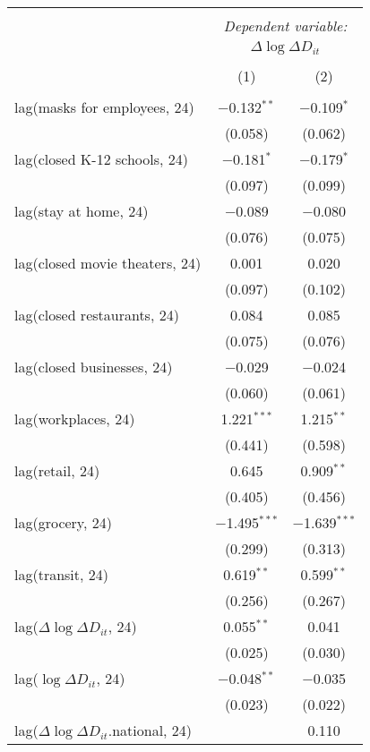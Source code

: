 \begin{tabular}{@{\extracolsep{1pt}}lcc} 
\\[-1.8ex]\hline 
\hline \\[-1.8ex] 
 & \multicolumn{2}{c}{\textit{Dependent variable:}} \\ 
\cline{2-3} 
 & \multicolumn{2}{c}{$\Delta \log \Delta D_{it}$} \\ 
\\[-1.8ex] & (1) & (2)\\ 
\hline \\[-1.8ex] 
 lag(masks for employees, 24) & $-$0.132$^{**}$ & $-$0.109$^{*}$ \\ 
  & (0.058) & (0.062) \\ 
  lag(closed K-12 schools, 24) & $-$0.181$^{*}$ & $-$0.179$^{*}$ \\ 
  & (0.097) & (0.099) \\ 
  lag(stay at home, 24) & $-$0.089 & $-$0.080 \\ 
  & (0.076) & (0.075) \\ 
  lag(closed movie theaters, 24) & 0.001 & 0.020 \\ 
  & (0.097) & (0.102) \\ 
  lag(closed restaurants, 24) & 0.084 & 0.085 \\ 
  & (0.075) & (0.076) \\ 
  lag(closed businesses, 24) & $-$0.029 & $-$0.024 \\ 
  & (0.060) & (0.061) \\ 
  lag(workplaces, 24) & 1.221$^{***}$ & 1.215$^{**}$ \\ 
  & (0.441) & (0.598) \\ 
  lag(retail, 24) & 0.645 & 0.909$^{**}$ \\ 
  & (0.405) & (0.456) \\ 
  lag(grocery, 24) & $-$1.495$^{***}$ & $-$1.639$^{***}$ \\ 
  & (0.299) & (0.313) \\ 
  lag(transit, 24) & 0.619$^{**}$ & 0.599$^{**}$ \\ 
  & (0.256) & (0.267) \\ 
  lag($\Delta \log \Delta D_{it}$, 24) & 0.055$^{**}$ & 0.041 \\ 
  & (0.025) & (0.030) \\ 
  lag($\log \Delta D_{it}$, 24) & $-$0.048$^{**}$ & $-$0.035 \\ 
  & (0.023) & (0.022) \\ 
  lag($\Delta \log \Delta D_{it}$.national, 24) &  & 0.110 \\ 

\end{tabular}
